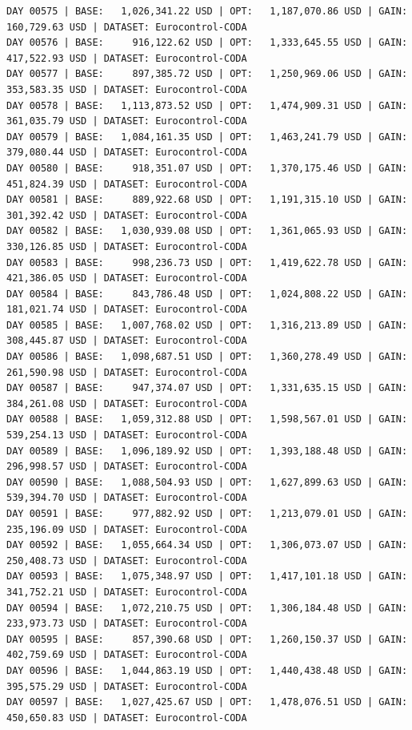 \documentclass[11pt,a4paper]{article}
\begin{document}
\begin{verbatim}
DAY 00575 | BASE:   1,026,341.22 USD | OPT:   1,187,070.86 USD | GAIN: 160,729.63 USD | DATASET: Eurocontrol-CODA
DAY 00576 | BASE:     916,122.62 USD | OPT:   1,333,645.55 USD | GAIN: 417,522.93 USD | DATASET: Eurocontrol-CODA
DAY 00577 | BASE:     897,385.72 USD | OPT:   1,250,969.06 USD | GAIN: 353,583.35 USD | DATASET: Eurocontrol-CODA
DAY 00578 | BASE:   1,113,873.52 USD | OPT:   1,474,909.31 USD | GAIN: 361,035.79 USD | DATASET: Eurocontrol-CODA
DAY 00579 | BASE:   1,084,161.35 USD | OPT:   1,463,241.79 USD | GAIN: 379,080.44 USD | DATASET: Eurocontrol-CODA
DAY 00580 | BASE:     918,351.07 USD | OPT:   1,370,175.46 USD | GAIN: 451,824.39 USD | DATASET: Eurocontrol-CODA
DAY 00581 | BASE:     889,922.68 USD | OPT:   1,191,315.10 USD | GAIN: 301,392.42 USD | DATASET: Eurocontrol-CODA
DAY 00582 | BASE:   1,030,939.08 USD | OPT:   1,361,065.93 USD | GAIN: 330,126.85 USD | DATASET: Eurocontrol-CODA
DAY 00583 | BASE:     998,236.73 USD | OPT:   1,419,622.78 USD | GAIN: 421,386.05 USD | DATASET: Eurocontrol-CODA
DAY 00584 | BASE:     843,786.48 USD | OPT:   1,024,808.22 USD | GAIN: 181,021.74 USD | DATASET: Eurocontrol-CODA
DAY 00585 | BASE:   1,007,768.02 USD | OPT:   1,316,213.89 USD | GAIN: 308,445.87 USD | DATASET: Eurocontrol-CODA
DAY 00586 | BASE:   1,098,687.51 USD | OPT:   1,360,278.49 USD | GAIN: 261,590.98 USD | DATASET: Eurocontrol-CODA
DAY 00587 | BASE:     947,374.07 USD | OPT:   1,331,635.15 USD | GAIN: 384,261.08 USD | DATASET: Eurocontrol-CODA
DAY 00588 | BASE:   1,059,312.88 USD | OPT:   1,598,567.01 USD | GAIN: 539,254.13 USD | DATASET: Eurocontrol-CODA
DAY 00589 | BASE:   1,096,189.92 USD | OPT:   1,393,188.48 USD | GAIN: 296,998.57 USD | DATASET: Eurocontrol-CODA
DAY 00590 | BASE:   1,088,504.93 USD | OPT:   1,627,899.63 USD | GAIN: 539,394.70 USD | DATASET: Eurocontrol-CODA
DAY 00591 | BASE:     977,882.92 USD | OPT:   1,213,079.01 USD | GAIN: 235,196.09 USD | DATASET: Eurocontrol-CODA
DAY 00592 | BASE:   1,055,664.34 USD | OPT:   1,306,073.07 USD | GAIN: 250,408.73 USD | DATASET: Eurocontrol-CODA
DAY 00593 | BASE:   1,075,348.97 USD | OPT:   1,417,101.18 USD | GAIN: 341,752.21 USD | DATASET: Eurocontrol-CODA
DAY 00594 | BASE:   1,072,210.75 USD | OPT:   1,306,184.48 USD | GAIN: 233,973.73 USD | DATASET: Eurocontrol-CODA
DAY 00595 | BASE:     857,390.68 USD | OPT:   1,260,150.37 USD | GAIN: 402,759.69 USD | DATASET: Eurocontrol-CODA
DAY 00596 | BASE:   1,044,863.19 USD | OPT:   1,440,438.48 USD | GAIN: 395,575.29 USD | DATASET: Eurocontrol-CODA
DAY 00597 | BASE:   1,027,425.67 USD | OPT:   1,478,076.51 USD | GAIN: 450,650.83 USD | DATASET: Eurocontrol-CODA

\end{verbatim}
\end{document}

